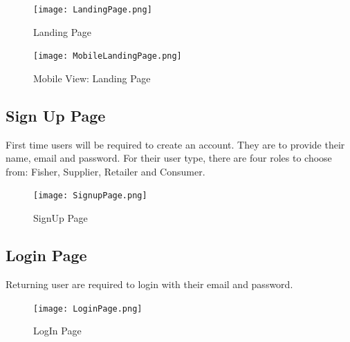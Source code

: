 \begin{figure}[H]
	\centering
	\texttt{[image: LandingPage.png]}
	\caption{Landing Page}
	\label{fig:landing_page}
\end{figure}

\begin{figure}[H]
	\centering
	\texttt{[image: MobileLandingPage.png]}
	\caption{Mobile View: Landing Page}
	\label{fig:mobile_landing_page}
\end{figure}	

\subsection{Sign Up Page}
First time users will be required to create an account. They are to provide their name, email and password. For their user type, there are four roles to choose from: Fisher, Supplier, Retailer and Consumer. 

\begin{figure}[H]
	\centering
	\texttt{[image: SignupPage.png]}
	\caption{SignUp Page}
	\label{fig:signup_page}
\end{figure}

\subsection{Login Page}
Returning user are required to login with their email and password.

\begin{figure}[H]
	\centering
	\texttt{[image: LoginPage.png]}
	\caption{LogIn Page}
	\label{fig:login_page}
\end{figure}

